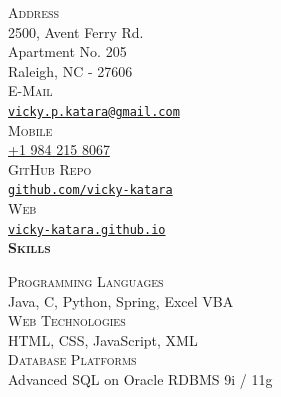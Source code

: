 \documentclass[letterpaper,12pt,final]{memoir}
\newcommand{\SmallSep}{\vspace{0.5em}}
\newcommand{\CVSection}[1]
	{\Large\textbf{\textsc{{#1}}}\par
	\SmallSep\normalsize\normalfont}
\newcommand{\CVItemSC}[1]
{{\textsc{\color{Plum} #1}}}
\begin{document}

\begin{flushright} 
	\footnotesize
	\SmallSep
	\CVItemSC{Address}\\%
	
	2500, Avent Ferry Rd.\\
	Apartment No. 205\\
	Raleigh, NC - 27606\\
	\SmallSep
	\CVItemSC{E-Mail}\\%
	\href{mailto:vicky.p.katara@gmail.com}{\texttt{vicky.p.katara@gmail.com}}\\
	\SmallSep
	\CVItemSC{Mobile}\\%
	\href{tel:+19842158067}{+1 984 215 8067}\\
	\SmallSep
	\SmallSep
	\CVItemSC{GitHub Repo}\\%
	\href{https://github.com/vicky-katara}{\texttt{github.com/vicky-katara}}\\
	\SmallSep
	\CVItemSC{Web}\\%
	\href{https://vicky-katara.github.io/}{\texttt{vicky-katara.github.io}}\\
	\SmallSep
\SmallSep
\CVSection{Skills}
\CVItemSC{Programming Languages}\\
{\footnotesize Java, C, Python, Spring, Excel VBA}
\SmallSep\\
\CVItemSC{Web Technologies}\\
{\footnotesize HTML, CSS, JavaScript, XML}
\SmallSep\\
\CVItemSC{Database Platforms}\\
{\footnotesize Advanced SQL on Oracle RDBMS 9i / 11g}

\end{flushright}
\end{document}

